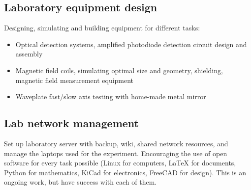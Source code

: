 \documentclass[10pt]{article}
\begin{document}
\subsection*{Laboratory equipment design}

Designing, simulating and building equipment for different tasks:
\begin{itemize}
\item Optical detection systems, amplified photodiode detection circuit design and assembly
\item Magnetic field coils, simulating optimal size and geometry, shielding, magnetic field measurement equipment
\item Waveplate fast/slow axis testing with home-made metal mirror
\end{itemize}

\subsection*{Lab network management}

Set up laboratory server with backup, wiki, shared network resources, and manage the laptops used for the experiment. Encouraging the use of open software for every task possible (Linux for computers, LaTeX for documents, Python for mathematics, KiCad for electronics, FreeCAD for design). This is an ongoing work, but have success with each of them.
\end{document}

